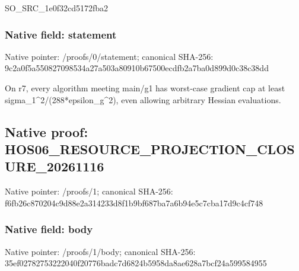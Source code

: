 \documentclass[10pt,a4paper]{article}
\begin{document}
\begingroup\raggedright\sloppy SO\_\allowbreak{}SRC\_\allowbreak{}1e0f32cd5172fba2\par\endgroup

\subsubsection{Native field: statement}
Native pointer: /proofs/0/statement; canonical SHA-256: 9c2a0f5a550827098534a27a503a80910b67500ecdfb2a7ba0d899d0c38c38dd

\begingroup\raggedright\sloppy On r7,\allowbreak{} every algorithm meeting main/\allowbreak{}g1 has worst-case gradient cap at least sigma\_\allowbreak{}1\textasciicircum{}2/\allowbreak{}(288*epsilon\_\allowbreak{}g\textasciicircum{}2),\allowbreak{} even allowing arbitrary Hessian evaluations.\par\endgroup

\subsection{Native proof: HOS06\_\allowbreak{}RESOURCE\_\allowbreak{}PROJECTION\_\allowbreak{}CLOSURE\_\allowbreak{}20261116}
Native pointer: /proofs/1; canonical SHA-256: f6fb26c870204c9d88e2a314233d8f1b9bf687ba7a6b94e5c7cba17d9c4cf748

\subsubsection{Native field: body}
Native pointer: /proofs/1/body; canonical SHA-256: 35ef02782753222040f20776badc7d6824b5958da8ae628a7bcf24a599584955
\end{document}
